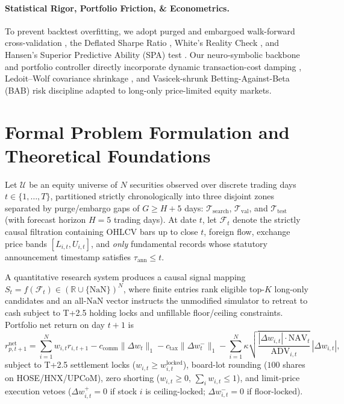\documentclass[11pt]{article}
\begin{document}
\paragraph{Statistical Rigor, Portfolio Friction, \& Econometrics.}
To prevent backtest overfitting, we adopt purged and embargoed walk-forward cross-validation \citep{lopezdeprado2018advances}, the Deflated Sharpe Ratio \citep{bailey2014deflated}, White's Reality Check \citep{white2000reality}, and Hansen's Superior Predictive Ability (SPA) test \citep{hansen2005spa}. Our neuro-symbolic backbone and portfolio controller directly incorporate dynamic transaction-cost damping \citep{garleanu2013dynamic}, Ledoit--Wolf covariance shrinkage \citep{ledoit2004shrinkage}, and Vasicek-shrunk Betting-Against-Beta (BAB) risk discipline \citep{vasicek1973note,frazzini2014bab} adapted to long-only price-limited equity markets.

\section{Formal Problem Formulation and Theoretical Foundations}
\label{sec:theory}
Let $\mathcal{U}$ be an equity universe of $N$ securities observed over discrete trading days $t \in \{1, \dots, T\}$, partitioned strictly chronologically into three disjoint zones separated by purge/embargo gaps of $G \ge H + 5$ days: $\mathcal{T}_{\text{search}}$, $\mathcal{T}_{\text{val}}$, and $\mathcal{T}_{\text{test}}$ (with forecast horizon $H=5$ trading days). At date $t$, let $\mathcal{F}_t$ denote the strictly causal filtration containing OHLCV bars up to close $t$, foreign flow, exchange price bands $[L_{i,t}, U_{i,t}]$, and \emph{only} fundamental records whose statutory announcement timestamp satisfies $\tau_{\text{ann}} \le t$.

A quantitative research system produces a causal signal mapping $S_t = f(\mathcal{F}_t) \in (\mathbb{R} \cup \{\text{NaN}\})^N$, where finite entries rank eligible top-$K$ long-only candidates and an all-$\text{NaN}$ vector instructs the unmodified simulator to retreat to cash subject to T+2.5 holding locks and unfillable floor/ceiling constraints. Portfolio net return on day $t+1$ is
\begin{equation}
  r^{\text{net}}_{p,t+1} = \sum_{i=1}^N w_{i,t} r_{i,t+1} - c_{\text{comm}} \|\Delta w_t\|_1 - c_{\text{tax}} \|\Delta w_t^-\|_1 - \sum_{i=1}^N \kappa \sqrt{\frac{|\Delta w_{i,t}| \cdot \text{NAV}_t}{\text{ADV}_{i,t}}} \, |\Delta w_{i,t}|,
  \label{eq:net_return}
\end{equation}
subject to T+2.5 settlement locks ($w_{i,t} \ge w^{\text{locked}}_{i,t}$), board-lot rounding ($100$ shares on HOSE/HNX/UPCoM), zero shorting ($w_{i,t} \ge 0$, $\sum_i w_{i,t} \le 1$), and limit-price execution vetoes ($\Delta w_{i,t}^+ = 0$ if stock $i$ is ceiling-locked; $\Delta w_{i,t}^- = 0$ if floor-locked).
\end{document}
